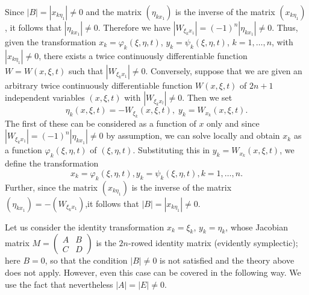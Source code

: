 Since $|B| = |x_{k\eta_1}| \neq 0$ and the matrix $(\eta_{kx_1})$ is the inverse of the matrix $(x_{k\eta_1})$, it follows that $|\eta_{kx_1}| \neq 0$. Therefore we have $|W_{\xi_k x_1}| = (-1)^n | \eta_{kx_1}| \neq 0$. Thus, given the transformation $x_k =  \varphi_k (\xi, \eta, t)$, $y_k = \psi_k(\xi, \eta, t)$, $k=1, \ldots, n$, with $|x_{k\eta_1}| \neq 0$, there exists a twice continuously differentiable function $W = W(x, \xi, t)$ such that $|W_{\xi_k x_1} | \neq 0$. Conversely, suppose that we are given an arbitrary twice continuously differentiable function $W(x,\xi,t)$ of $2n+1$ independent variables $(x,\xi,t)$ with $|W_{\xi_k x_l}| \neq 0 $. Then we set
$$
\eta_k (x, \xi, t) = - W_{\xi_k} (x, \xi, t) , \; y_k = W_{x_k} (x, \xi, t). 
$$
The first of these can be considered as a function of $x$ only and since $|W_{\xi_k x_1}| = (-1)^n | \eta_{kx_1}| \neq 0$ by assumption, we can solve locally and obtain $x_k$ as a function $\varphi_k(\xi, \eta, t)$ of $(\xi, \eta, t)$. Substituting this in $y_k = W_{x_k} (x, \xi, t)$, we define the transformation
$$
x_k = \varphi_k (\xi, \eta, t), y_k = \psi_k (\xi, \eta, t) , k = 1, \ldots, n.
$$
Further, since the matrix $(x_{k\eta_1})$ is the inverse of the matrix 
$(\eta_{kx_1}) = - (W_{\xi_k x_1})$,\pageoriginale it follows that $|B| = |x_{k \eta_1}| \neq 0$.

Let us consider the identity transformation $x_k = \xi_k$, $y_k = \eta_k$, whose Jacobian matrix $M = \left(\begin{smallmatrix} 
A & B\\C & D\end{smallmatrix} \right)$ is the $2n$-rowed identity matrix (evidently symplectic); here $B=0$, so that the condition $|B| \neq 0$ is not satisfied and the theory above does not apply. However, even this case can be covered in the following way. We use the fact that nevertheless $|A| = |E| \neq 0$.

